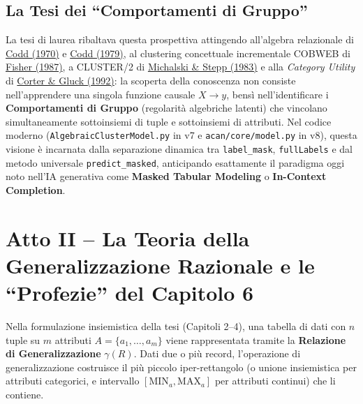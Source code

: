 \documentclass[10pt,a4paper]{article}
\begin{document}
\subsection{La Tesi dei ``Comportamenti di Gruppo''}
La tesi di laurea ribaltava questa prospettiva attingendo all'algebra relazionale di \href{https://www.engineering.upenn.edu/~zives/03f/cis550/codd.pdf}{Codd (1970)} e \href{https://en.wikipedia.org/wiki/Relational_Model/Tasmania}{Codd (1979)}, al clustering concettuale incrementale COBWEB di \href{https://doi.org/10.1007/BF00114265}{Fisher (1987)}, a CLUSTER/2 di \href{https://pubmed.ncbi.nlm.nih.gov/21869124/}{Michalski \& Stepp (1983)} e alla \textit{Category Utility} di \href{https://en.wikipedia.org/wiki/Category_utility}{Corter \& Gluck (1992)}: la scoperta della conoscenza non consiste nell'apprendere una singola funzione causale $X \rightarrow y$, bens\`i nell'identificare i \textbf{Comportamenti di Gruppo} (regolarit\`a algebriche latenti) che vincolano simultaneamente sottoinsiemi di tuple e sottoinsiemi di attributi. Nel codice moderno (\texttt{AlgebraicClusterModel.py} in v7 e \texttt{acan/core/model.py} in v8), questa visione \`e incarnata dalla separazione dinamica tra \texttt{label\_mask}, \texttt{fullLabels} e dal metodo universale \texttt{predict\_masked}, anticipando esattamente il paradigma oggi noto nell'IA generativa come \textbf{Masked Tabular Modeling} o \textbf{In-Context Completion}.

\section{Atto II -- La Teoria della Generalizzazione Razionale e le ``Profezie'' del Capitolo 6}

Nella formulazione insiemistica della tesi (Capitoli 2--4), una tabella di dati con $n$ tuple su $m$ attributi $A = \{a_1, \dots, a_m\}$ viene rappresentata tramite la \textbf{Relazione di Generalizzazione} $\gamma(R)$. Dati due o pi\`u record, l'operazione di generalizzazione costruisce il pi\`u piccolo iper-rettangolo (o unione insiemistica per attributi categorici, e intervallo $[\text{MIN}_a, \text{MAX}_a]$ per attributi continui) che li contiene.
\end{document}
